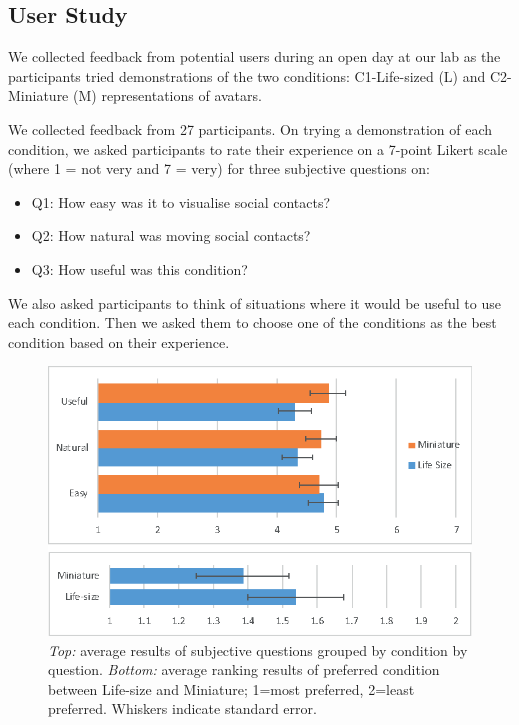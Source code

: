 \subsection{User Study}

We collected feedback from potential users during an open day at our lab as the participants tried demonstrations of the two conditions: C1-Life-sized (L) and C2-Miniature (M) representations of avatars. 

We collected feedback from 27 participants. On trying a demonstration of each condition, we asked participants to rate their experience on a 7-point Likert scale (where 1 = not very and 7 = very) for three subjective questions on: 

\begin{itemize}
    \item Q1: How easy was it to visualise social contacts?
    \item Q2: How natural was moving social contacts?
    \item Q3: How useful was this condition?
\end{itemize}

We also asked participants to think of situations where it would be useful to use each condition. Then we asked them to choose one of the conditions as the best condition based on their experience. 

\begin{figure}[h]
    \centering
    \includegraphics[width=.8\linewidth]{images/ismar17/images-09.eps}
    \caption{\textit{Top:} average results of subjective questions grouped by condition by question. \textit{Bottom:} average ranking results of preferred condition between Life-size and Miniature; 1=most preferred, 2=least preferred. Whiskers indicate standard error.}
    \label{fig:continuum:results}
\end{figure}

